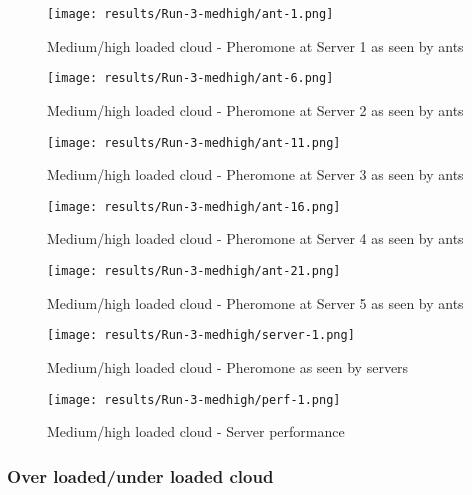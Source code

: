 \begin{figure}
	\centering
		\texttt{[image: results/Run-3-medhigh/ant-1.png]}
	\caption{Medium/high loaded cloud - Pheromone at Server 1 as seen by ants}
	\label{fig:3serv-ant1-medhigh}
\end{figure}

\begin{figure}
	\centering
		\texttt{[image: results/Run-3-medhigh/ant-6.png]}
	\caption{Medium/high loaded cloud - Pheromone at Server 2 as seen by ants}
	\label{fig:3serv-ant6-medhigh}
\end{figure}

\begin{figure}
	\centering
		\texttt{[image: results/Run-3-medhigh/ant-11.png]}
	\caption{Medium/high loaded cloud - Pheromone at Server 3 as seen by ants}
	\label{fig:3serv-ant11-medhigh}
\end{figure}

\begin{figure}
	\centering
		\texttt{[image: results/Run-3-medhigh/ant-16.png]}
	\caption{Medium/high loaded cloud - Pheromone at Server 4 as seen by ants}
	\label{fig:3serv-ant16-medhigh}
\end{figure}

\begin{figure}
	\centering
		\texttt{[image: results/Run-3-medhigh/ant-21.png]}
	\caption{Medium/high loaded cloud - Pheromone at Server 5 as seen by ants}
	\label{fig:3serv-ant25-medhigh}
\end{figure}

\begin{figure}
	\centering
		\texttt{[image: results/Run-3-medhigh/server-1.png]}
	\caption{Medium/high loaded cloud - Pheromone as seen by servers}
	\label{fig:3serv-pher-medhigh}
\end{figure}

\begin{figure}
	\centering
		\texttt{[image: results/Run-3-medhigh/perf-1.png]}
	\caption{Medium/high loaded cloud - Server performance}
	\label{fig:3serv-perf-medhigh}
\end{figure}

\subsubsection{Over loaded/under loaded cloud}

